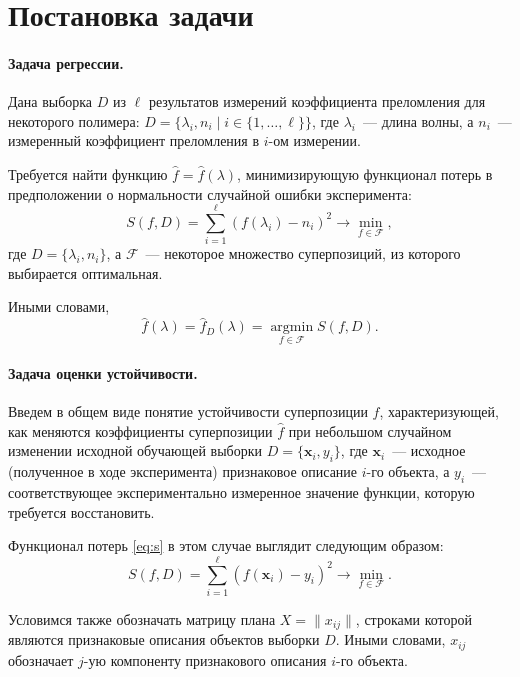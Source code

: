 \documentclass[12pt,a4paper]{article}
\theoremstyle{definition}
\begin{document}
\section{Постановка задачи}

\paragraph{Задача регрессии.}
Дана выборка $D$ из $\ell$ результатов измерений коэффициента
преломления для некоторого полимера:
$D = \{ \lambda_i, n_i \mid i \in \{ 1, \dots, \ell \} \}$, где $\lambda_i$~--- длина волны,
а $n_i$~--- измеренный коэффициент преломления в $i$-ом измерении.

Требуется найти функцию $\hat{f} = \hat{f}(\lambda)$, минимизирующую функционал
потерь в предположении о нормальности случайной ошибки эксперимента:
\begin{equation}
  S(f, D) = \sum_{i = 1}^\ell (f(\lambda_i) - n_i)^2 \rightarrow \min_{f \in \mathcal{F}},
  \label{eq:s}
\end{equation}
где $D = \{ \lambda_i, n_i\}$, а $\mathcal{F}$~---
некоторое множество суперпозиций, из которого выбирается оптимальная.

Иными словами,
\begin{equation}
  \hat{f}(\lambda) = \hat{f}_D(\lambda) = \mathop{\arg \min}\limits_{f \in \mathcal{F}} S(f, D).
  \label{eq:fhat}
\end{equation}

\paragraph{Задача оценки устойчивости.}
Введем в общем виде понятие устойчивости суперпозиции $f$, характеризующей,
как меняются коэффициенты суперпозиции $\hat{f}$ при небольшом случайном
изменении исходной обучающей выборки
$D = \{ \mathbf{x}_i, y_i \}$,
где $\mathbf{x}_i$~--- исходное (полученное в ходе эксперимента)
признаковое описание $i$-го объекта, а $y_i$~--- соответствующее экспериментально
измеренное значение функции, которую требуется восстановить.

Функционал потерь \eqref{eq:s} в этом случае выглядит следующим образом: 
\begin{equation}
  S(f, D) = \sum_{i = 1}^\ell (f(\mathbf{x}_i) - y_i)^2 \rightarrow \min_{f \in \mathcal{F}}.
  \label{eq:s_common}
\end{equation}

Условимся также обозначать матрицу плана $X = \| x_{ij} \|$, строками которой
являются признаковые описания объектов выборки $D$. Иными словами, $x_{ij}$
обозначает $j$-ую компоненту признакового описания $i$-го объекта.
\end{document}
